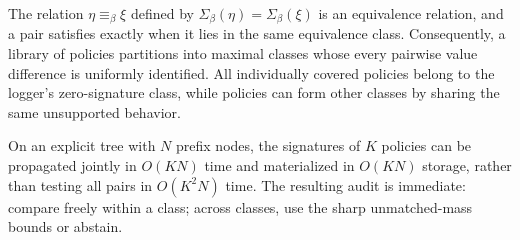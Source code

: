 \begin{proposition}
\label{prop:classes}
The relation $\eta\equiv_\beta\xi$ defined by
$\Sigma_\beta(\eta)=\Sigma_\beta(\xi)$ is an equivalence relation, and a pair satisfies \UCC exactly when it lies in the same equivalence class. Consequently, a library of policies partitions into maximal classes whose every pairwise value difference is uniformly identified. All individually covered policies belong to the logger's zero-signature class, while policies can form other classes by sharing the same unsupported behavior.
\end{proposition}

On an explicit tree with $N$ prefix nodes, the signatures of $K$ policies can be propagated jointly in $O(KN)$ time and materialized in $O(KN)$ storage, rather than testing all pairs in $O(K^2N)$ time. The resulting audit is immediate: compare freely within a class; across classes, use the sharp unmatched-mass bounds or abstain.
